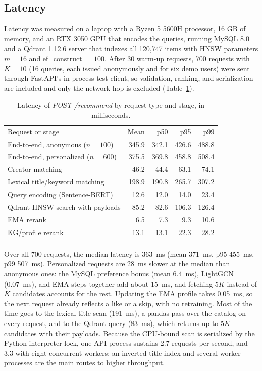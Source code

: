 \documentclass[3p,times,procedia]{elsarticle}
\begin{document}
\subsection{Latency}
\label{sec:latency}
Latency was measured on a laptop with a Ryzen 5 5600H processor, 16 GB of memory, and an RTX 3050 GPU that encodes the queries, running MySQL 8.0 and a Qdrant 1.12.6 server that indexes all 120,747 items with HNSW parameters $m=16$ and ef\_construct $=100$. After 30 warm-up requests, 700 requests with $K=10$ (16 queries, each issued anonymously and for six demo users) were sent through FastAPI's in-process test client, so validation, ranking, and serialization are included and only the network hop is excluded (Table~\ref{tab:latency}).

\begin{table}[!ht]
\centering
\caption{Latency of \emph{POST /recommend} by request type and stage, in milliseconds.}
\label{tab:latency}
\footnotesize
\begin{tabular*}{\hsize}{@{\extracolsep{\fill}}lrrrr@{}}
\toprule
Request or stage & Mean & p50 & p95 & p99 \\
\colrule
End-to-end, anonymous ($n=100$) & 345.9 & 342.1 & 426.6 & 488.8 \\
End-to-end, personalized ($n=600$) & 375.5 & 369.8 & 458.8 & 508.4 \\
\colrule
Creator matching & 46.2 & 44.4 & 63.1 & 74.1 \\
Lexical title/keyword matching & 198.9 & 190.8 & 265.7 & 307.2 \\
Query encoding (Sentence-BERT) & 12.6 & 12.0 & 14.0 & 23.4 \\
Qdrant HNSW search with payloads & 85.2 & 82.6 & 106.3 & 126.4 \\
EMA rerank & 6.5 & 7.3 & 9.3 & 10.6 \\
KG/profile rerank & 13.1 & 13.1 & 22.3 & 28.2 \\
\botrule
\end{tabular*}
\end{table}

Over all 700 requests, the median latency is 363~ms (mean 371~ms, p95 455~ms, p99 507~ms). Personalized requests are 28~ms slower at the median than anonymous ones: the MySQL preference bonus (mean 6.4~ms), LightGCN (0.07~ms), and EMA steps together add about 15~ms, and fetching $5K$ instead of $K$ candidates accounts for the rest. Updating the EMA profile takes 0.05~ms, so the next request already reflects a like or a skip, with no retraining. Most of the time goes to the lexical title scan (191~ms), a pandas pass over the catalog on every request, and to the Qdrant query (83~ms), which returns up to $5K$ candidates with their payloads. Because the CPU-bound scan is serialized by the Python interpreter lock, one API process sustains 2.7 requests per second, and 3.3 with eight concurrent workers; an inverted title index and several worker processes are the main routes to higher throughput.
\end{document}
